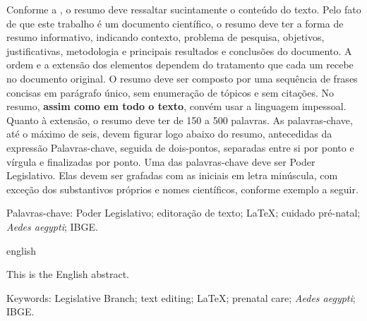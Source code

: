 \begin{resumo} %

Conforme a , o resumo deve ressaltar sucintamente o conteúdo do texto. Pelo fato de que este trabalho é um documento científico, o resumo deve ter a forma de resumo informativo, indicando contexto, problema de pesquisa, objetivos, justificativas, metodologia e principais resultados e conclusões do documento. A ordem e a extensão dos elementos dependem do tratamento que cada um recebe no documento original. O resumo deve ser composto por uma sequência de frases concisas em parágrafo único, sem enumeração de tópicos e sem citações. No resumo, \textbf{assim como em todo o texto}, convém usar a linguagem impessoal. Quanto à extensão, o resumo deve ter de 150 a 500 palavras. As palavras-chave, até o máximo de seis, devem figurar logo abaixo do resumo, antecedidas da expressão Palavras-chave, seguida de dois-pontos, separadas entre si por ponto e vírgula e finalizadas por ponto. Uma das palavras-chave deve ser Poder Legislativo. Elas devem ser grafadas com as iniciais em letra minúscula, com exceção dos substantivos próprios e nomes científicos, conforme exemplo a seguir.

Palavras-chave: Poder Legislativo; editoração de texto; LaTeX; cuidado pré-natal; \emph{Aedes aegypti}; IBGE.

\end{resumo}

\begin{resumo}[Abstract]
\begin{otherlanguage*}{english} %

This is the English abstract.

Keywords: Legislative Branch; text editing; LaTeX; prenatal care; \emph{Aedes aegypti}; IBGE.

\end{otherlanguage*}
\end{resumo}